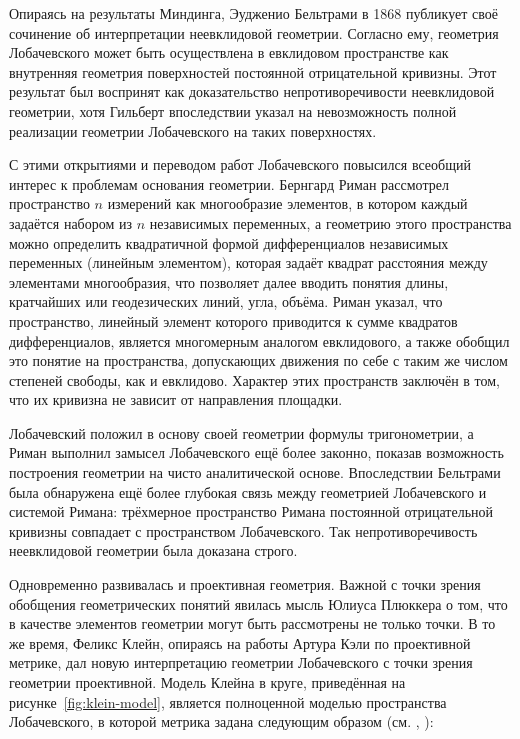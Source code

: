 \documentclass{article}
\numberwithin{equation}{section}
\begin{document}
Опираясь на результаты Миндинга, Эудженио Бельтрами в 1868 публикует
своё сочинение об интерпретации неевклидовой геометрии. Согласно ему,
геометрия Лобачевского может быть осуществлена в евклидовом
пространстве как внутренняя геометрия поверхностей постоянной
отрицательной кривизны. Этот результат был воспринят как
доказательство непротиворечивости неевклидовой геометрии, хотя
Гильберт впоследствии указал на невозможность полной реализации
геометрии Лобачевского на таких поверхностях.

С этими открытиями и переводом работ Лобачевского повысился всеобщий
интерес к проблемам основания геометрии. Бернгард Риман рассмотрел
пространство $n$ измерений как многообразие элементов, в котором
каждый задаётся набором из $n$ независимых переменных, а геометрию
этого пространства можно определить квадратичной формой дифференциалов
независимых переменных (линейным элементом), которая задаёт квадрат
расстояния между элементами многообразия, что позволяет далее вводить
понятия длины, кратчайших или геодезических линий, угла, объёма. Риман
указал, что пространство, линейный элемент которого приводится к сумме
квадратов дифференциалов, является многомерным аналогом евклидового, а
также обобщил это понятие на пространства, допускающих движения по
себе с таким же числом степеней свободы, как и евклидово. Характер
этих пространств заключён в том, что их кривизна не зависит от
направления площадки.

Лобачевский положил в основу своей геометрии формулы тригонометрии, а
Риман выполнил замысел Лобачевского ещё более законно, показав
возможность построения геометрии на чисто аналитической основе.
Впоследствии Бельтрами была обнаружена ещё более глубокая связь между
геометрией Лобачевского и системой Римана: трёхмерное пространство
Римана постоянной отрицательной кривизны совпадает с пространством
Лобачевского. Так непротиворечивость неевклидовой геометрии была
доказана строго.

Одновременно развивалась и проективная геометрия. Важной с точки
зрения обобщения геометрических понятий явилась мысль Юлиуса Плюккера
о том, что в качестве элементов геометрии могут быть рассмотрены не
только точки. В то же время, Феликс Клейн, опираясь на работы Артура
Кэли по проективной метрике, дал новую интерпретацию геометрии
Лобачевского с точки зрения геометрии проективной. Модель Клейна в
круге, приведённая на рисунке \ref{fig:klein-model}, является
полноценной моделью пространства Лобачевского, в которой метрика
задана следующим образом (см. \cite{prasolov04}, \cite{zaslavsky04}):
\end{document}
